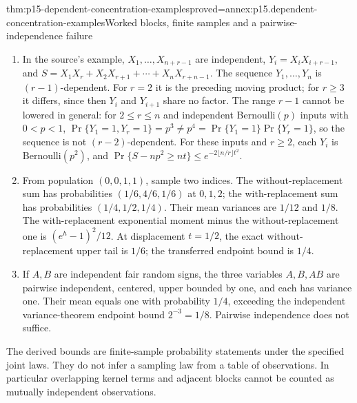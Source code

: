 \begin{hbtheorem}{thm:p15-dependent-concentration-examples}{proved=annex:p15.dependent-concentration-examples}{Worked blocks, finite samples and a pairwise-independence failure}
\begin{enumerate}
For \(n=5,r=2\), the two residue sets have sizes \(3,2\), with weights
\(3/5,2/5\), and the range-only bound is \(e^{-4t^2}\).
\item In the source's example, \(X_1,\ldots,X_{n+r-1}\) are independent,
\(Y_i=X_iX_{i+r-1}\), and \(S=X_1X_r+X_2X_{r+1}+\cdots+X_nX_{r+n-1}\).
The sequence \(Y_1,\ldots,Y_n\) is \((r-1)\)-dependent. For \(r=2\) it is
the preceding moving product; for \(r\geq3\) it differs, since then
\(Y_i\) and \(Y_{i+1}\) share no factor. The range \(r-1\) cannot be
lowered in general: for \(2\leq r\leq n\) and independent
Bernoulli\((p)\) inputs with \(0<p<1\),
\(\Pr\{Y_1=1,Y_r=1\}=p^3\neq p^4=\Pr\{Y_1=1\}\Pr\{Y_r=1\}\), so the
sequence is not \((r-2)\)-dependent. For these inputs and \(r\geq2\),
each \(Y_i\) is Bernoulli\((p^2)\), and
\(\Pr\{S-np^2\geq nt\}\leq e^{-2\lfloor n/r\rfloor t^2}\).
\item From population \((0,0,1,1)\), sample two indices.
The without-replacement sum has probabilities \((1/6,4/6,1/6)\)
at \(0,1,2\); the with-replacement sum has probabilities
\((1/4,1/2,1/4)\). Their mean variances are \(1/12\) and \(1/8\).
The with-replacement exponential moment minus the without-replacement
one is \((e^h-1)^2/12\). At displacement \(t=1/2\), the exact
without-replacement upper tail is \(1/6\); the transferred endpoint
bound is \(1/4\).
\item If \(A,B\) are independent fair random signs, the three variables
\(A,B,AB\) are pairwise independent, centered, upper bounded by one,
and each has variance one. Their mean equals one with probability
\(1/4\), exceeding the independent variance-theorem endpoint bound
\(2^{-3}=1/8\). Pairwise independence does not suffice.
\end{enumerate}
\end{hbtheorem}

The derived bounds are finite-sample probability statements under the
specified joint laws. They do not infer a sampling law from a table of
observations. In particular overlapping kernel terms and adjacent blocks
cannot be counted as mutually independent observations.
